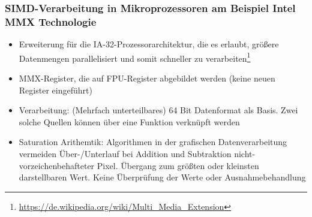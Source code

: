 \subsubsection{SIMD-Verarbeitung in Mikroprozessoren am Beispiel Intel MMX Technologie}
\begin{itemize}
	\item Erweiterung für die IA-32-Prozessorarchitektur, die es erlaubt, größere Datenmengen parallelisiert und somit schneller zu verarbeiten\footnote{\url{https://de.wikipedia.org/wiki/Multi_Media_Extension}}
	\item MMX-Register, die auf FPU-Register abgebildet werden (keine neuen Register eingeführt)
	\item Verarbeitung: (Mehrfach unterteilbares) 64 Bit Datenformat als Basis. Zwei solche Quellen können über eine Funktion verknüpft werden
	\item Saturation Arithemtik: Algorithmen in der grafischen Datenverarbeitung vermeiden Über-/Unterlauf bei Addition und Subtraktion nicht-vorzeichenbehafteter Pixel. Übergang zum größten oder kleinsten darstellbaren Wert. Keine Überprüfung der Werte oder Ausnahmebehandlung
\end{itemize}
